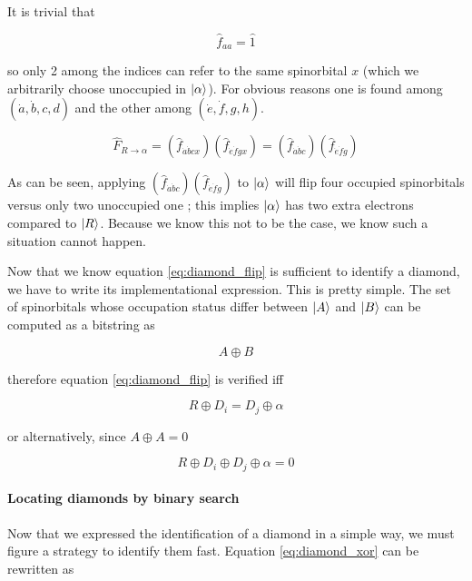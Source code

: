 \documentclass[./thesis.tex]{subfiles}
\begin{document}
It is trivial that

\begin{equation}
\hat f_{aa} = \hat 1
\end{equation}

so only 2 among the indices can refer to the same spinorbital $x$ (which we arbitrarily choose unoccupied in ${\ket{\alpha}}$). For obvious reasons one is found among $(\dot a,\dot b,c,d)$ and the other among $(\dot e,\dot f,g,h)$.

\begin{equation}
\hat F_{R \rightarrow \alpha} = (\hat f_{\dot a \dot bcx})(\hat f_{\dot e \dot fgx}) = (\hat f_{\dot a \dot bc})(\hat f_{\dot e \dot fg})
\end{equation}

As can be seen, applying $(\hat f_{\dot a \dot bc})(\hat f_{\dot e \dot fg})$ to ${\ket{\alpha}}$ will flip four occupied spinorbitals versus only two unoccupied one ; this implies ${\ket{\alpha}}$ has two extra electrons compared to $\ket R$. Because we know this not to be the case, we know such a situation cannot happen.

Now that we know equation \ref{eq:diamond_flip} is sufficient to identify a diamond, we have to write its implementational expression. This is pretty simple. The set of spinorbitals whose occupation status differ between $\ket A$ and $\ket B$ can be computed as a bitstring as

\begin{equation}
A \oplus B
\end{equation}

therefore equation \ref{eq:diamond_flip} is verified iff

\begin{equation}
R \oplus D_i = D_j \oplus \alpha
\end{equation}

or alternatively, since $A \oplus A = 0$

\begin{equation}
R \oplus D_i \oplus D_j \oplus \alpha = 0
\label{eq:diamond_xor}
\end{equation}

\paragraph{Locating diamonds by binary search}
Now that we expressed the identification of a diamond in a simple way, we must figure a strategy to identify them fast. Equation \ref{eq:diamond_xor} can be rewritten as
\end{document}
